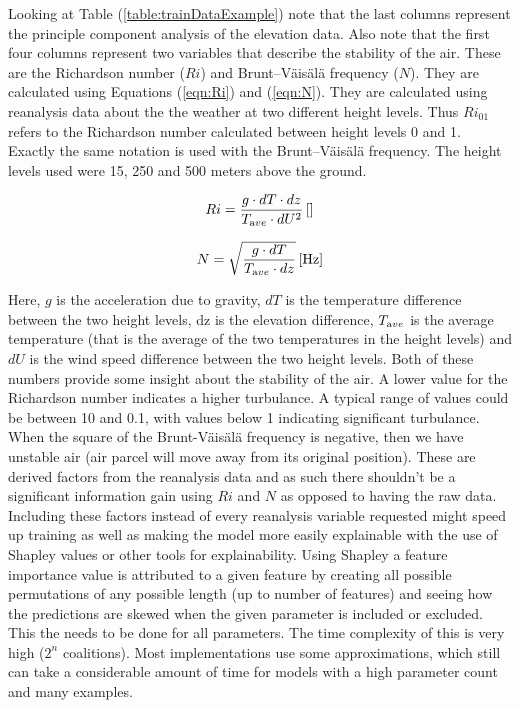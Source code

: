 Looking at Table (\ref{table:trainDataExample}) note that the last \nPCA columns represent the principle component analysis of the elevation data. Also note that the first four columns represent two variables that describe the stability of the air. These are the Richardson number ($Ri$)\cite{richardson_number_skybrary} and Brunt–Väisälä frequency\cite{brunt_vaisala_freq_eumtrain} ($N$). They are calculated using Equations (\ref{eqn:Ri}) and (\ref{eqn:N})\cite{mean_gust_HA_HO}. They are calculated using reanalysis data about the the weather at two different height levels. Thus $Ri_{01}$ refers to the Richardson number calculated between height levels 0 and 1. Exactly the same notation is used with the Brunt–Väisälä frequency. The height levels used were 15, 250 and 500 meters above the ground.

\begin{equation}
    \label{eqn:Ri}
    Ri = \frac{g \cdot dT \cdot dz}{T_{\textrm ave} \cdot dU^2} \, \mathrm{[]}
\end{equation}

\begin{equation}
    \label{eqn:N}
    N = \sqrt{\frac{g \cdot dT }{T_{\textrm ave} \cdot dz}} \, \mathrm{[Hz]}
\end{equation}

Here, $g$ is the acceleration due to gravity, $dT$ is the temperature difference between the two height levels, dz is the elevation difference, $T_{\textrm ave}$ is the average temperature (that is the average of the two temperatures in the height levels) and $dU$ is the wind speed difference between the two height levels. Both of these numbers provide some insight about the stability of the air. A lower value for the Richardson number indicates a higher turbulance. A typical range of values could be between 10 and 0.1, with values below 1 indicating significant turbulance\cite{richardson_number_skybrary}. When the square of the Brunt-Väisälä frequency is negative, then we have unstable air (air parcel will move away from its original position)\cite{brunt_vaisala_freq_eumtrain}. These are derived factors from the reanalysis data and as such there shouldn't be a significant information gain using $Ri$ and $N$ as opposed to having the raw data. Including these factors instead of every reanalysis variable requested might speed up training as well as making the model more easily explainable with the use of Shapley values or other tools for explainability. Using Shapley a feature importance value is attributed to a given feature by creating all possible permutations of any possible length (up to number of features) and seeing how the predictions are skewed when the given parameter is included or excluded. This the needs to be done for all parameters. The time complexity of this is very high ($2^n$ coalitions)\cite{shapley_information}. Most implementations use some approximations, which still can take a considerable amount of time for models with a high parameter count and many examples.

